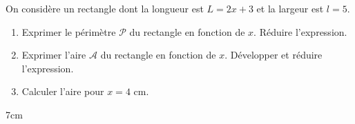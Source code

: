 \documentclass[a4paper]{book}
\begin{document}
    \begin{exercice}
        On considère un rectangle dont la longueur est $L = 2x + 3$ et la largeur est $l = 5$.
        \begin{enumerate}
            \item Exprimer le périmètre $\mathcal{P}$ du rectangle en fonction de $x$. Réduire l'expression.
            \item Exprimer l'aire $\mathcal{A}$ du rectangle en fonction de $x$. Développer et réduire l'expression.
            \item Calculer l'aire pour $x = 4$ cm.
        \end{enumerate}
        \begin{ZoneReponse}{7cm}
        \end{ZoneReponse}
    \end{exercice}
     
    
\end{document}
